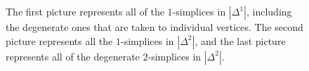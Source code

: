 \documentclass[12pt]{article}
\theoremstyle{plain}
\theoremstyle{definition}
\theoremstyle{remark}
\begin{document}
\begin{figure}[!htp]
\begin{center}
\end{center}
\caption{The first picture represents all of the $1$-simplices in $|\Delta^1|$, including the degenerate ones that are taken to individual vertices. The second picture represents all the $1$-simplices in $|\Delta^2|$, and the last picture represents all of the degenerate $2$-simplices in $|\Delta^2|$.}\label{F: fig10}
\end{figure}
\end{document}
